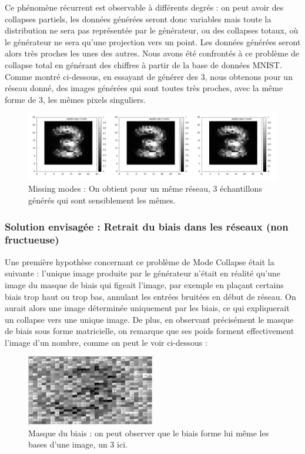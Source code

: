 Ce phénomène récurrent est observable à différents degrés : on peut avoir des collapses partiels, les données générées seront donc variables mais toute la distribution ne sera pas représentée par le générateur, ou des collapses totaux, où le générateur ne sera qu'une projection vers un point. Les données générées seront alors très proches les unes des autres.
Nous avons été confrontés à ce problème de collapse total en générant des chiffres à partir de la base de données MNIST. Comme montré ci-dessous, en essayant de générer des 3, nous obtenons pour un réseau donné, des images générées qui sont toutes très proches, avec la même forme de 3, les mêmes pixels singuliers.

\begin{figure}[h]
\begin{center}
\includegraphics[width=1\textwidth]{images/missing_modes_2.png}\caption{Missing modes : On obtient pour un même réseau, 3 échantillons générés qui sont sensiblement les mêmes.}
\end{center}
\end{figure}


\subsubsection{Solution envisagée : Retrait du biais dans les réseaux (non fructueuse)}

Une première hypothèse concernant ce problème de Mode Collapse était la suivante : l'unique image produite par le générateur n'était en réalité qu'une image du masque de biais qui figeait l'image, par exemple en plaçant certains biais trop haut ou trop bas, annulant les entrées bruitées en début de réseau. On aurait alors une image déterminée uniquement par les biais, ce qui expliquerait un collapse vers une unique image.
De plus, en observant précisément le masque de biais sous forme matricielle, on remarque que ses poids forment effectivement l'image d'un nombre, comme on peut le voir ci-dessous :

\begin{figure}[h]
\begin{center}
\includegraphics[width=0.5\textwidth]{images/masqueBiais.png}\caption{Masque du biais : on peut observer que le biais forme lui même les bases d'une image, un 3 ici.}
\end{center}
\end{figure}

